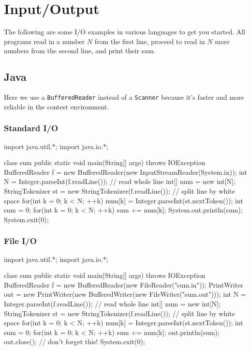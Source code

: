 \chapter{Input/Output}

The following are some I/O examples in various languages to get you started. All programs read in a number $N$ from the first line, proceed to read in $N$ more numbers from the second line, and print their sum.

\section{Java}

\lstset{language=Java}

Here we use a \texttt{BufferedReader} instead of a \texttt{Scanner} because it's faster and more reliable in the contest environment.

\subsection{Standard I/O}

\begin{mylstlisting}
import java.util.*;
import java.io.*;

class sum {
    public static void main(String[] args) throws IOException {
        BufferedReader f = new BufferedReader(new InputStreamReader(System.in));
	    int N = Integer.parseInt(f.readLine()); // read whole line
	    int[] num = new int[N];
	    StringTokenizer st = new StringTokenizer(f.readLine()); // split line by white space
    	for(int k = 0; k < N; ++k) {
    		num[k] = Integer.parseInt(st.nextToken());
    	}
    	int sum = 0;
    	for(int k = 0; k < N; ++k) {
    		sum += num[k];
    	}
    	System.out.println(sum);
    	System.exit(0);
    }
}
\end{mylstlisting}

\subsection{File I/O}

\begin{mylstlisting}
import java.util.*;
import java.io.*;

class sum {
    public static void main(String[] args) throws IOException {
        BufferedReader f = new BufferedReader(new FileReader("sum.in"));
		PrintWriter out = new PrintWriter(new BufferedWriter(new FileWriter("sum.out")));
	    int N = Integer.parseInt(f.readLine()); // read whole line
	    int[] num = new int[N];
	    StringTokenizer st = new StringTokenizer(f.readLine()); // split line by white space
    	for(int k = 0; k < N; ++k) {
    		num[k] = Integer.parseInt(st.nextToken());
    	}
    	int sum = 0;
    	for(int k = 0; k < N; ++k) {
    		sum += num[k];
    	}
    	out.println(sum);
    	out.close(); // don't forget this!
    	System.exit(0);
    }
}
\end{mylstlisting}

